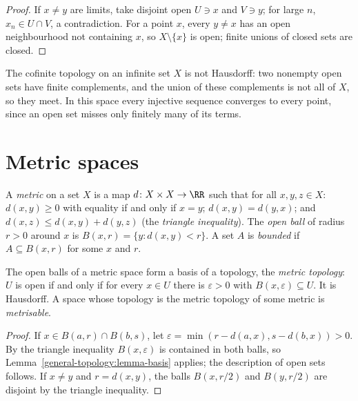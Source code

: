 \begin{proof}
If $x \neq y$ are limits, take disjoint open $U \ni x$ and $V \ni y$; for large $n$, $x_n \in U \cap V$, a contradiction. For a point $x$, every
$y \neq x$ has an open neighbourhood not containing $x$, so $X \setminus \{x\}$ is open; finite unions of closed sets are closed.
\end{proof}

\begin{counterexample}\label{general-topology:counterexample-cofinite-not-hausdorff}
The cofinite topology on an infinite set $X$ is not Hausdorff: two nonempty open sets have finite complements, and the union of
these complements is not all of $X$, so they meet. In this space every injective sequence converges to every point, since an open set
misses only finitely many of its terms.
\end{counterexample}

\section{Metric spaces}\label{general-topology:section-metric}

\begin{definition}\label{general-topology:definition-metric}
A \emph{metric} on a set $X$ is a map $d \colon X \times X \to \RR$ such that for all $x, y, z \in X$: $d(x, y) \geq 0$ with equality if and
only if $x = y$; $d(x, y) = d(y, x)$; and $d(x, z) \leq d(x, y) + d(y, z)$ (the \emph{triangle inequality}). The \emph{open ball} of radius
$r > 0$ around $x$ is $B(x, r) = \{y : d(x, y) < r\}$. A set $A$ is \emph{bounded} if $A \subseteq B(x, r)$ for some $x$ and $r$.
\end{definition}

\begin{lemma}\label{general-topology:lemma-metric-topology}
The open balls of a metric space form a basis of a topology, the \emph{metric topology}: $U$ is open if and only if for every $x \in U$
there is $\varepsilon > 0$ with $B(x, \varepsilon) \subseteq U$. It is Hausdorff. A space whose topology is the metric topology of some metric
is \emph{metrisable}.
\end{lemma}

\begin{proof}
If $x \in B(a, r) \cap B(b, s)$, let $\varepsilon = \min(r - d(a, x), s - d(b, x)) > 0$. By the triangle inequality $B(x, \varepsilon)$ is contained in
both balls, so Lemma~\ref{general-topology:lemma-basis} applies; the description of open sets follows. If $x \neq y$ and
$r = d(x, y)$, the balls $B(x, r/2)$ and $B(y, r/2)$ are disjoint by the triangle inequality.
\end{proof}

